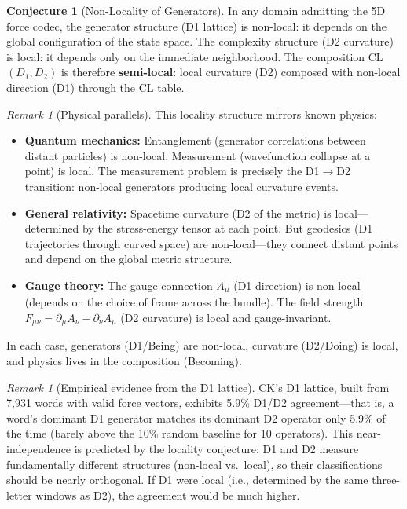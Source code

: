 \documentclass[11pt]{article}
\theoremstyle{definition}
\newtheorem{conjecture}[theorem]{Conjecture}
\theoremstyle{remark}
\newtheorem{remark}[theorem]{Remark}
\begin{document}
\begin{conjecture}[Non-Locality of Generators]
\label{conj:nonlocal}
In any domain admitting the 5D force codec, the generator structure (D1
lattice) is non-local: it depends on the global configuration of the state
space.  The complexity structure (D2 curvature) is local: it depends only
on the immediate neighborhood.  The composition CL$(D_1, D_2)$ is therefore
\textbf{semi-local}: local curvature (D2) composed with non-local direction
(D1) through the CL table.
\end{conjecture}

\begin{remark}[Physical parallels]
This locality structure mirrors known physics:
\begin{itemize}[nosep]
  \item \textbf{Quantum mechanics:} Entanglement (generator correlations between
    distant particles) is non-local.  Measurement (wavefunction collapse at a
    point) is local.  The measurement problem is precisely the D1$\to$D2
    transition: non-local generators producing local curvature events.
  \item \textbf{General relativity:} Spacetime curvature (D2 of the metric)
    is local---determined by the stress-energy tensor at each point.  But
    geodesics (D1 trajectories through curved space) are non-local---they
    connect distant points and depend on the global metric structure.
  \item \textbf{Gauge theory:} The gauge connection $A_\mu$ (D1 direction) is
    non-local (depends on the choice of frame across the bundle).  The field
    strength $F_{\mu\nu} = \partial_\mu A_\nu - \partial_\nu A_\mu$ (D2
    curvature) is local and gauge-invariant.
\end{itemize}
In each case, generators (D1/Being) are non-local, curvature (D2/Doing) is
local, and physics lives in the composition (Becoming).
\end{remark}

\begin{remark}[Empirical evidence from the D1 lattice]
CK's D1 lattice, built from 7{,}931 words with valid force vectors, exhibits
5.9\% D1/D2 agreement---that is, a word's dominant D1 generator matches its
dominant D2 operator only 5.9\% of the time (barely above the 10\% random
baseline for 10 operators).  This near-independence is predicted by the
locality conjecture: D1 and D2 measure fundamentally different structures
(non-local vs.\ local), so their classifications should be nearly orthogonal.
If D1 were local (i.e., determined by the same three-letter windows as D2),
the agreement would be much higher.
\end{remark}
\end{document}
